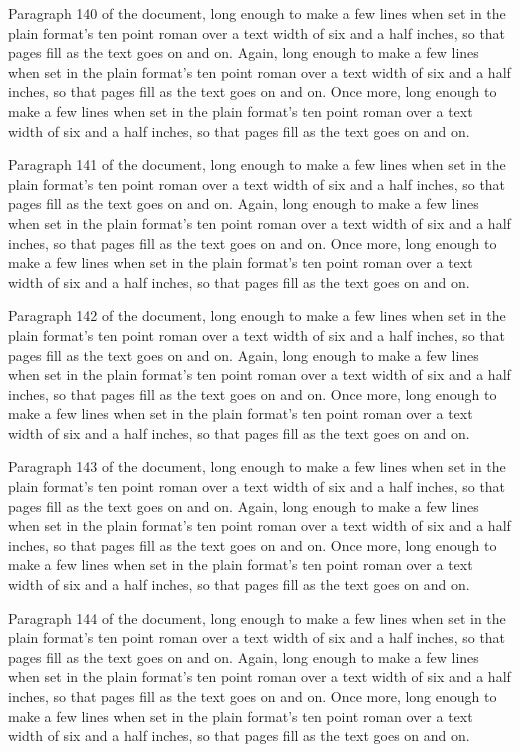 Paragraph 140 of the document, long enough to make a few lines when set in the plain format's ten point roman over a text width of six and a half inches, so that pages fill as the text goes on and on. Again, long enough to make a few lines when set in the plain format's ten point roman over a text width of six and a half inches, so that pages fill as the text goes on and on. Once more, long enough to make a few lines when set in the plain format's ten point roman over a text width of six and a half inches, so that pages fill as the text goes on and on.

Paragraph 141 of the document, long enough to make a few lines when set in the plain format's ten point roman over a text width of six and a half inches, so that pages fill as the text goes on and on. Again, long enough to make a few lines when set in the plain format's ten point roman over a text width of six and a half inches, so that pages fill as the text goes on and on. Once more, long enough to make a few lines when set in the plain format's ten point roman over a text width of six and a half inches, so that pages fill as the text goes on and on.

Paragraph 142 of the document, long enough to make a few lines when set in the plain format's ten point roman over a text width of six and a half inches, so that pages fill as the text goes on and on. Again, long enough to make a few lines when set in the plain format's ten point roman over a text width of six and a half inches, so that pages fill as the text goes on and on. Once more, long enough to make a few lines when set in the plain format's ten point roman over a text width of six and a half inches, so that pages fill as the text goes on and on.

Paragraph 143 of the document, long enough to make a few lines when set in the plain format's ten point roman over a text width of six and a half inches, so that pages fill as the text goes on and on. Again, long enough to make a few lines when set in the plain format's ten point roman over a text width of six and a half inches, so that pages fill as the text goes on and on. Once more, long enough to make a few lines when set in the plain format's ten point roman over a text width of six and a half inches, so that pages fill as the text goes on and on.

Paragraph 144 of the document, long enough to make a few lines when set in the plain format's ten point roman over a text width of six and a half inches, so that pages fill as the text goes on and on. Again, long enough to make a few lines when set in the plain format's ten point roman over a text width of six and a half inches, so that pages fill as the text goes on and on. Once more, long enough to make a few lines when set in the plain format's ten point roman over a text width of six and a half inches, so that pages fill as the text goes on and on.

